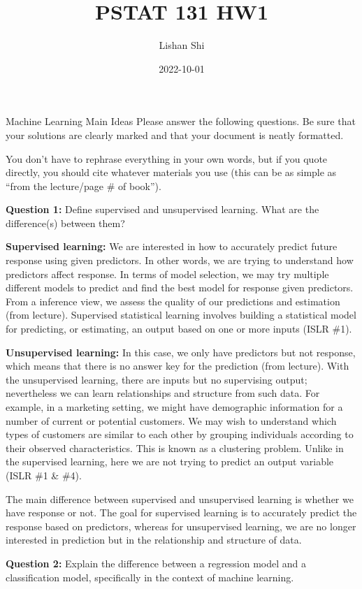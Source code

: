 \documentclass[
]{article}
\title{PSTAT 131 HW1}
\author{Lishan Shi}
\date{2022-10-01}
\begin{document}
\maketitle

Machine Learning Main Ideas Please answer the following questions. Be
sure that your solutions are clearly marked and that your document is
neatly formatted.

You don't have to rephrase everything in your own words, but if you
quote directly, you should cite whatever materials you use (this can be
as simple as ``from the lecture/page \# of book'').

\textbf{Question 1:} Define supervised and unsupervised learning. What
are the difference(s) between them?

\textbf{Supervised learning:} We are interested in how to accurately
predict future response using given predictors. In other words, we are
trying to understand how predictors affect response. In terms of model
selection, we may try multiple different models to predict and find the
best model for response given predictors. From a inference view, we
assess the quality of our predictions and estimation (from lecture).
Supervised statistical learning involves building a statistical model
for predicting, or estimating, an output based on one or more inputs
(ISLR \#1).

\textbf{Unsupervised learning:} In this case, we only have predictors
but not response, which means that there is no answer key for the
prediction (from lecture). With the unsupervised learning, there are
inputs but no supervising output; nevertheless we can learn
relationships and structure from such data. For example, in a marketing
setting, we might have demographic information for a number of current
or potential customers. We may wish to understand which types of
customers are similar to each other by grouping individuals according to
their observed characteristics. This is known as a clustering problem.
Unlike in the supervised learning, here we are not trying to predict an
output variable (ISLR \#1 \& \#4).

The main difference between supervised and unsupervised learning is
whether we have response or not. The goal for supervised learning is to
accurately predict the response based on predictors, whereas for
unsupervised learning, we are no longer interested in prediction but in
the relationship and structure of data.

\textbf{Question 2:} Explain the difference between a regression model
and a classification model, specifically in the context of machine
learning.
\end{document}
